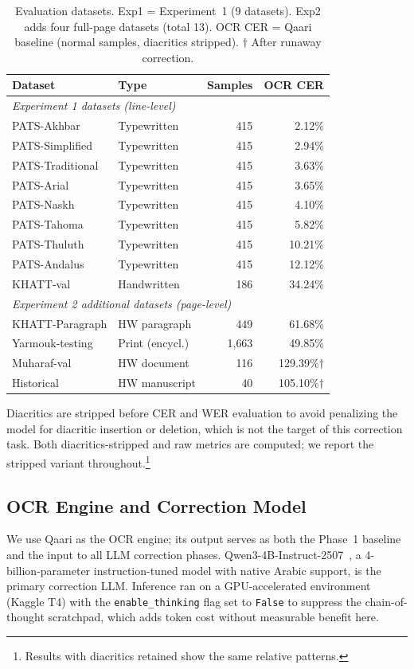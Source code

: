 \documentclass[conference]{IEEEtran}
\begin{document}
\begin{table}[t]
\caption{Evaluation datasets. Exp1 = Experiment~1 (9 datasets).
Exp2 adds four full-page datasets (total 13). OCR CER = Qaari baseline
(normal samples, diacritics stripped). $\dagger$ After runaway correction.}
\label{tab:datasets}
\begin{center}
\small
\begin{tabular}{llrr}
\toprule
\textbf{Dataset} & \textbf{Type} & \textbf{Samples} & \textbf{OCR CER} \\
\midrule
\multicolumn{4}{l}{\textit{Experiment 1 datasets (line-level)}} \\
PATS-Akhbar       & Typewritten & 415 & 2.12\% \\
PATS-Simplified   & Typewritten & 415 & 2.94\% \\
PATS-Traditional  & Typewritten & 415 & 3.63\% \\
PATS-Arial        & Typewritten & 415 & 3.65\% \\
PATS-Naskh        & Typewritten & 415 & 4.10\% \\
PATS-Tahoma       & Typewritten & 415 & 5.82\% \\
PATS-Thuluth      & Typewritten & 415 & 10.21\% \\
PATS-Andalus      & Typewritten & 415 & 12.12\% \\
KHATT-val         & Handwritten & 186 & 34.24\% \\
\midrule
\multicolumn{4}{l}{\textit{Experiment 2 additional datasets (page-level)}} \\
KHATT-Paragraph   & HW paragraph  & 449  & 61.68\% \\
Yarmouk-testing   & Print (encycl.) & 1{,}663 & 49.85\% \\
Muharaf-val       & HW document   & 116  & 129.39\%$\dagger$ \\
Historical        & HW manuscript & 40   & 105.10\%$\dagger$ \\
\bottomrule
\end{tabular}
\end{center}
\end{table}

Diacritics are stripped before CER and WER evaluation to avoid penalizing the
model for diacritic insertion or deletion, which is not the target of this
correction task. Both diacritics-stripped and raw metrics are computed; we
report the stripped variant throughout.\footnote{Results with diacritics
retained show the same relative patterns.}

\subsection{OCR Engine and Correction Model}
We use Qaari as the OCR engine; its output serves as both the Phase~1 baseline
and the input to all LLM correction phases.
Qwen3-4B-Instruct-2507~\cite{qwen3}, a 4-billion-parameter instruction-tuned
model with native Arabic support, is the primary correction LLM. Inference ran
on a GPU-accelerated environment (Kaggle T4) with the \texttt{enable\_thinking}
flag set to \texttt{False} to suppress the chain-of-thought scratchpad, which
adds token cost without measurable benefit here.
\end{document}
